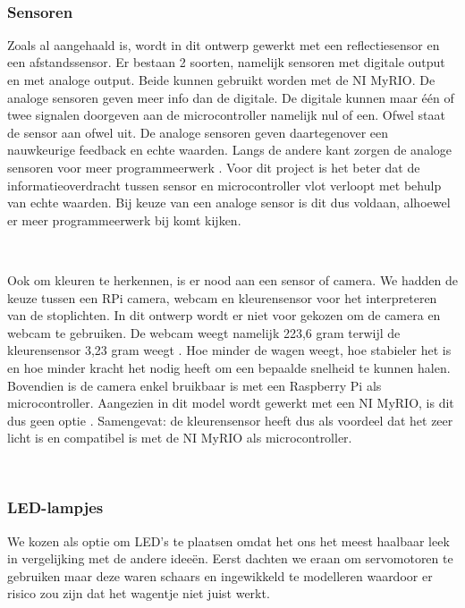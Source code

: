 \documentclass[a4paper,twoside,kulak]{kulakreport} %
\begin{document}
~
\subsubsection{Sensoren}
Zoals al aangehaald is, wordt in dit ontwerp gewerkt met een reflectiesensor en een afstandssensor. Er bestaan 2 soorten, namelijk sensoren met digitale output en met analoge output. Beide kunnen gebruikt worden met de NI MyRIO. De analoge sensoren geven meer info dan de digitale. De digitale kunnen maar één of twee signalen doorgeven aan de microcontroller namelijk nul of een. Ofwel staat de sensor aan ofwel uit. De analoge sensoren geven daartegenover een nauwkeurige feedback en echte waarden. Langs de andere kant zorgen de analoge sensoren voor meer programmeerwerk \cite{DigitaalOfAnaloog}. Voor dit project is het beter dat de informatieoverdracht tussen sensor en microcontroller vlot verloopt met behulp van echte waarden. Bij keuze van een analoge sensor is dit dus voldaan, alhoewel er meer programmeerwerk bij komt kijken. %

~

Ook om kleuren te herkennen, is er nood aan een sensor of camera. We hadden de keuze tussen een RPi camera, webcam en kleurensensor voor het interpreteren van de stoplichten. In dit ontwerp wordt er niet voor gekozen om de camera en webcam te gebruiken. De webcam weegt namelijk 223,6 gram terwijl de kleurensensor 3,23 gram weegt \cite{Webcam,TCS34725KleurSensorBOB}. Hoe minder de wagen weegt, hoe stabieler het is en hoe minder kracht het nodig heeft om een bepaalde snelheid te kunnen halen. Bovendien is de camera enkel bruikbaar is met een Raspberry Pi als microcontroller. Aangezien in dit model wordt gewerkt met een NI MyRIO, is dit dus geen optie \cite{RPi-camera}. Samengevat: de kleurensensor heeft dus als voordeel dat het zeer licht is en compatibel is met de NI MyRIO als microcontroller.

~

\subsubsection{LED-lampjes}
We kozen als optie om LED's te plaatsen omdat het ons het meest haalbaar leek in vergelijking met de andere ideeën. Eerst dachten we eraan om servomotoren te gebruiken maar deze waren schaars en ingewikkeld te modelleren waardoor er risico zou zijn dat het wagentje niet juist werkt.
\end{document}
